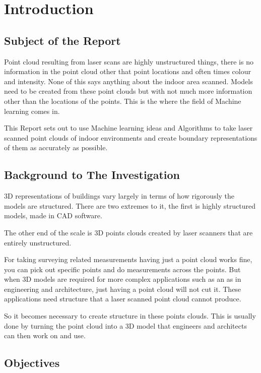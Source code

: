
\chapter{Introduction}
	
	\section{Subject of the Report}
	
		Point cloud resulting from laser scans are highly unstructured things, there is no information in the point cloud other that point locations and often times colour and intensity. None of this says anything about the indoor area scanned. Models need to be created from these point clouds but with not much more information other than the locations of the points. This is the where the field of Machine learning comes in.
		
		This Report sets out to use Machine learning ideas and Algorithms to take laser scanned point clouds of indoor environments and create boundary representations of them as accurately as possible.
	
	\section{Background to The Investigation}
	
		3D representations of buildings vary largely in terms of how rigorously the models are structured. There are two extremes to it, the first is highly structured models, made in CAD software.
		
		The other end of the scale is 3D points clouds created by laser scanners that are entirely unstructured.
		
		For taking surveying related measurements having just a point cloud works fine, you can pick out specific points and do measurements across the points. But when 3D models are required for more complex applications such as an as in engineering and architecture, just having a point cloud will not cut it. These applications need structure that a laser scanned point cloud cannot produce.
		
		So it becomes necessary to create structure in these points clouds. This is usually done by turning the point cloud into a 3D model that engineers and architects can then work on and use.
		
	\section{Objectives}
	
